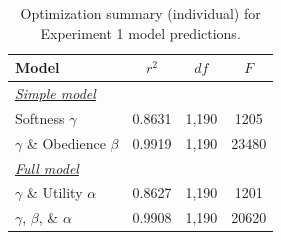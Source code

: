 \documentclass[11pt,a4paper]{article}
\begin{document}
	\begin{table}[t]
		\centering
		\begin{tabular}{p{4.5cm}ccc}
			\hline
			\hspace{0cm}Model & $r^2$ & $df$ & $F$  \\
			\hline
			
			\hspace{0cm}\underline{\textit{Simple model}} & & &  \\
			
			Softness $\gamma$ & 0.8631 & 1,190 & 1205  \\
			$\gamma$ \& Obedience $\beta$ & 0.9919 & 1,190 & 23480  \\
			
			\hspace{0cm}\underline{\textit{Full model}} & & & \\
			
			$\gamma$ \& Utility $\alpha$& 0.8627 & 1,190 & 1201 \\
			$\gamma$, $\beta$, \& $\alpha$& 0.9908 & 1,190 & 20620 \\
			\hline
		\end{tabular}
		\caption{Optimization summary (individual) for Experiment 1 model predictions.}
		\label{individual}
	\end{table}
\end{document}
